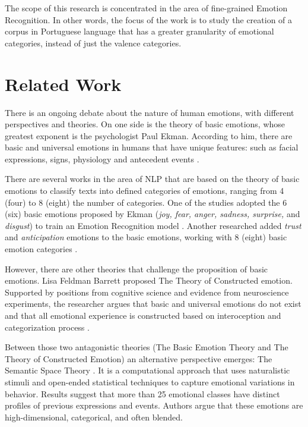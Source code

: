 \documentclass[12pt]{article}
\begin{document}
The scope of this research is concentrated in the area of fine-grained Emotion Recognition. In other words, the focus of the work is to study the creation of a corpus in Portuguese language that has a greater granularity of emotional categories, instead of just the valence categories.

\section{Related Work}

There is an ongoing debate about the nature of human emotions, with different perspectives and theories. On one side is the theory of basic emotions, whose greatest exponent is the psychologist Paul Ekman. According to him, there are basic and universal emotions in humans that have unique features: such as facial expressions, signs, physiology and antecedent events \cite{Ekman1992}.

There are several works in the area of NLP that are based on the theory of basic emotions to classify texts into defined categories of emotions, ranging from 4 (four) to 8 (eight) the number of categories. One of the studies adopted the 6 (six) basic emotions proposed by Ekman (\textit{joy, fear, anger, sadness, surprise,} and \textit{disgust}) to train an Emotion Recognition model \cite{Batbaatar2019}. Another researched added \textit{trust} and \textit{anticipation} emotions to the basic emotions, working with 8 (eight) basic emotion categories \cite{Sosea2020}.

However, there are other theories that challenge the proposition of basic emotions. Lisa Feldman Barrett proposed The Theory of Constructed emotion. Supported by positions from cognitive science and evidence from neuroscience experiments, the researcher argues that basic and universal emotions do not exist and that all emotional experience is constructed based on interoception and categorization process \cite{Barrett2016}.

Between those two antagonistic theories (The Basic Emotion Theory and The Theory of Constructed Emotion) an alternative perspective emerges: The Semantic Space Theory \cite{Cowen2021}. It is a computational approach that uses naturalistic stimuli and open-ended statistical techniques to capture emotional variations in behavior. Results suggest that more than 25 emotional classes have distinct profiles of previous expressions and events. Authors argue that these emotions are high-dimensional, categorical, and often blended.
\end{document}
